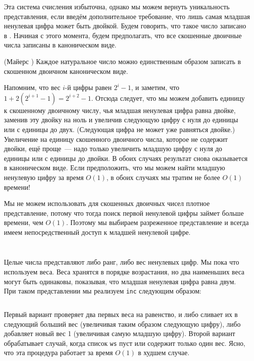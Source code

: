 \begin{frame}[fragile]{}

Эта система счисления избыточна, однако мы можем вернуть уникальность
представления, если введём дополнительное требование, что лишь
самая младшая ненулевая цифра может быть двойкой.  Будем говорить, что
такое число записано в . Начиная с этого момента, будем предполагать, что все
скошенные двоичные числа записаны в каноническом виде.


\begin{theorem}\label{th:9.1}
  (Майерс \cite{Myers1983}) Каждое натуральное число можно
  единственным образом записать в скошенном двоичном каноническом виде.
\end{theorem}
\end{frame}

\begin{frame}[fragile]{}

Напомним, что вес $i$-й цифры равен $2^i - 1$, и заметим, что $1 +
2(2^{i+1} - 1) = 2^{i+2} - 1$. Отсюда следует, что мы можем добавить
единицу к скошенному двоичному числу, чья младшая ненулевая цифра равна двойке,
заменив эту двойку на ноль и увеличив следующую цифру с нуля до
единицы или с единицы до двух. (Следующая цифра не может уже равняться
двойке.) Увеличение на единицу скошенного двоичного числа, которое не
содержит двойки, ещё проще~--- надо только увеличить младшую цифру с
нуля до единицы или с единицы до двойки. В обоих случаях результат
снова оказывается в каноническом виде. Если предположить, что мы можем
найти младшую ненулевую цифру за время $O(1)$, в обоих случаях мы
тратим не более $O(1)$ времени!
\end{frame}

\begin{frame}[fragile]{}
Мы не можем использовать для скошенных двоичных чисел плотное
представление, потому что тогда поиск первой ненулевой цифры займет
больше времени, чем $O(1)$. Поэтому мы выбираем разреженное
представление и всегда имеем непосредственный доступ к младшей
ненулевой цифре.
\inputminted[firstline=3,lastline=3]{haskell}{code/SkewNumbers.hs}

\end{frame}

\begin{frame}[fragile]{}
\inputminted[firstline=3,lastline=3]{haskell}{code/SkewNumbers.hs}
Целые числа представляют либо ранг, либо вес ненулевых цифр. Мы пока
что используем веса. Веса хранятся в порядке возрастания, но два
наименьших веса могут быть одинаковы, показывая, что младшая ненулевая
цифра равна двум. При таком представлении мы реализуем \lstinline!inc!
следующим образом:
\inputminted[firstline=5,lastline=7]{haskell}{code/SkewNumbers.hs}

Первый вариант проверяет два первых веса на равенство, и либо сливает
их в следующий больший вес (увеличивая таким образом следующую цифру),
либо добавляет новый вес 1 (увеличивая самую младшую цифру). Второй
вариант обрабатывает случай, когда список \lstinline!ws! пуст или
содержит только один вес. Ясно, что эта процедура работает за время
$O(1)$ в худшем случае.
\end{frame}

